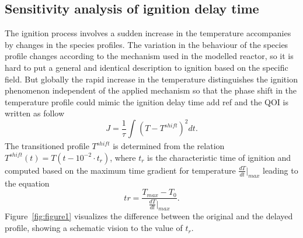 \documentclass[preprint,review,12pt]{elsarticle}
\begin{document}
\subsection{Sensitivity analysis of ignition delay time}
\label{SensitivityAnalysis}
The ignition process involves a sudden increase in the temperature accompanies by changes in the species profiles. The variation in the behaviour of the species profile changes according to the mechanism used in the modelled reactor, so it is hard to put a general and identical description to ignition based on the specific field. But globally the rapid increase in the temperature distinguishes the ignition phenomenon independent of the applied mechanism so that the phase shift in the temperature profile could mimic the ignition delay time {\color{red} add ref} and the QOI is written as follow
\begin{equation}
J=\frac{1}{\tau}\int_{}^{} (T-T^{shift})^2dt.
\end{equation}
The transitioned profile $T^{shift}$  is determined from the relation $T^{shift}(t)=T(t-10^{-2}\cdot t_r)$, where $t_r$ is the characteristic time of ignition and computed based on the maximum time gradient for temperature $\frac{dT}{dt}\Big|_{max}$ leading to the equation
\begin{equation}
tr=\frac{T_{max}-T_0}{\frac{dT}{dt}\Big|_{max}}.
\end{equation} 
Figure~\ref{fig:figure1} visualizes the difference between the original and the delayed profile, showing a schematic vision to the value of $t_r$.  
\end{document}

